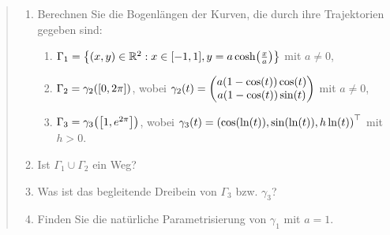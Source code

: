 \documentclass{exercise}
\begin{document}
	\begin{quote}
		\begin{enumerate}
			\item Berechnen Sie die Bogenlängen der Kurven, die durch ihre Trajektorien gegeben sind:
			\begin{enumerate}
				\item \(\Gamma_1 = \braces*{\parentheses*{x, y} \in \R^2 : x \in \brackets*{-1, 1}, y = a\cosh\parentheses*{\frac{x}{a}}}\) mit \(a \ne 0\),
				\item \(\Gamma_2 = \gamma_2\parentheses*{\brackets*{0, 2\pi}}\), wobei \(\gamma_2\parentheses*{t} = \begin{pmatrix}
					a\parentheses*{1 - \cos\parentheses*{t}}\cos\parentheses*{t}\\
					a\parentheses*{1 - \cos\parentheses*{t}}\sin\parentheses*{t}
				\end{pmatrix}\) mit \(a \ne 0\),
				\item \(\Gamma_3 = \gamma_3\parentheses*{\brackets*{1, e^{2\pi}}}\), wobei \(\gamma_3\parentheses*{t} = \parentheses*{\cos\parentheses*{\ln\parentheses*{t}}, \sin\parentheses*{\ln\parentheses*{t}}, h\ln\parentheses*{t}}^\top\) mit \(h > 0\).
			\end{enumerate}
			\item Ist \(\Gamma_1 \cup \Gamma_2\) ein Weg?
			\item Was ist das begleitende Dreibein von \(\Gamma_3\) bzw. \(\gamma_3\)?
			\item Finden Sie die natürliche Parametrisierung von \(\gamma_1\) mit \(a = 1\).
		\end{enumerate}
	\end{quote}
\end{document}
